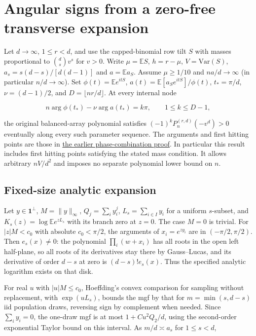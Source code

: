 \section{Angular signs from a zero-free transverse expansion}\label{sec:analytic-angular-signs}

Let $d\to\infty$, $1\le r<d$, and use the capped-binomial row tilt $S$ with masses proportional to $\binom ds v^s$ for $v>0$. Write $\mu=\mathbb ES$, $h=r-\mu$, $V=\mathrm{Var}(S)$, $a_s=s(d-s)/[d(d-1)]$ and $a=\mathbb E a_S$. Assume $\mu\ge1/10$ and $na/d\to\infty$ (in particular $n/d\to\infty$). Set $\phi(t)=\mathbb E e^{it S}$, $a(t)=\mathbb E[a_S e^{itS}]/\phi(t)$, $t_*=\pi/d$, $\nu=(d-1)/2$, and $D=\lfloor nr/d\rfloor$. At every internal node

\begin{equation*}
n\arg\phi(t_*)-\nu\arg a(t_*)=k\pi,\qquad 1\le k\le D-1,
\end{equation*}

the original balanced-array polynomial satisfies $(-1)^kP_n^{(r,d)}(-v^d)>0$ eventually along every such parameter sequence. The arguments and first hitting points are those in \href{https://github.com/ProgramComputer/open-math-research/blob/78e9ef2c0c0b7a5daed126efbe12a46d030d8200/topics/balanced-arrays/fifth-thirds/subquadratic-angular-nodes.md}{the earlier phase-combination proof}. In particular this result includes first hitting points satisfying the stated mass condition. It allows arbitrary $nV/d^2$ and imposes no separate polynomial lower bound on $n$.

\subsection{Fixed-size analytic expansion}

Let $y\in\mathbf1^\perp$, $M=\|y\|_\infty$, $Q_j=\sum_i y_i^j$, $L_s=\sum_{i\in I}y_i$ for a uniform $s$-subset, and $K_s(z)=\log\mathbb E e^{zL_s}$ with its branch zero at $z=0$. The case $M=0$ is trivial. For $|z|M<c_0$ with absolute $c_0<\pi/2$, the arguments of $x_i=e^{zy_i}$ are in $(-\pi/2,\pi/2)$. Then $e_s(x)\ne0$: the polynomial $\prod_i(w+x_i)$ has all roots in the open left half-plane, so all roots of its derivatives stay there by Gauss--Lucas, and its derivative of order $d-s$ at zero is $(d-s)!e_s(x)$. Thus the specified analytic logarithm exists on that disk.

For real $u$ with $|u|M\le c_0$, Hoeffding's convex comparison for sampling without replacement, with $\exp(uL_s)$, bounds the mgf by that for $m=\min(s,d-s)$ iid population draws, reversing sign by complement when needed. Since $\sum_i y_i=0$, the one-draw mgf is at most $1+C u^2Q_2/d$, using the second-order exponential Taylor bound on this interval. As $m/d\asymp a_s$ for $1\le s<d$,

